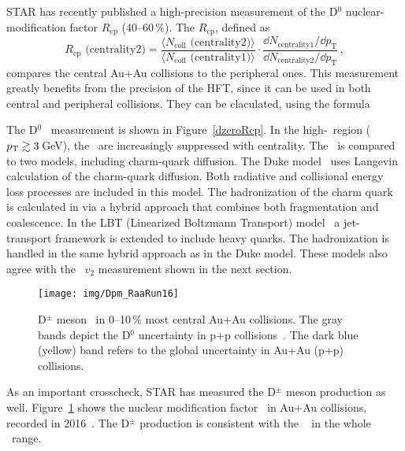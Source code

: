 STAR has recently published a high-precision measurement of the D$^0$  nuclear-modification factor $R_\mathrm{cp}$ (40--60$\,\%$)\@. The $R_\mathrm{cp}$, defined as
\begin{equation}
R_\mathrm{cp}\text{ (centrality2)} = \frac{\langle N_\mathrm{coll}\text{ (centrality2)}\rangle }
{\langle N_\mathrm{coll}\text{ (centrality1)} \rangle}
\cdot
\frac{\dd N_\text{centrality1}/\dd p_\mathrm{T}}
 {\dd N_\text{centrality2}/\dd p_\mathrm{T}}\,,
\end{equation}
compares the central Au+Au collisions to the peripheral ones. This measurement greatly benefits from the precision of the HFT, since it can be used in both central and peripheral collisions. They can be claculated, using the formula





The D$^0$ \Rcp\ measurement is shown in Figure~\ref{dzeroRcp}. In the high-\pt\ region (${}p_{\mathrm{T}}{} \gtrsim 3\,$GeV), the \dzero\ are increasingly suppressed with centrality. The \Rcp\ is compared to two models, including charm-quark diffusion. The Duke model~\cite{Duke, Duke2015} uses Langevin calculation of the charm-quark diffusion. Both radiative and collisional energy loss processes are included in this model. The hadronization of the charm quark is calculated in via a hybrid approach that combines both fragmentation and coalescence. In the LBT (Linearized Boltzmann Transport) model~\cite{LBT, LBTprivate} a jet-transport framework is extended to include heavy quarks. The hadronization is handled in the same hybrid approach as in the Duke model. These models also agree with the \dzero\ $v_2$ measurement shown in the next section.

\begin{figure}[!htb]
\begin{center}
 \texttt{[image: img/Dpm\_RaaRun16]}\\
\end{center}
\caption{\label{dpm} D$^\pm$ meson \Raa\ in 0--10$\,\%$ most central Au+Au collisions. The gray bands depict the D$^0$ uncertainty in p+p collisions~\cite{posterQmVanek,publishedDzero}. The dark blue (yellow) band refers to the global uncertainty in Au+Au (p+p) collisions.}
\end{figure}

As an important crosscheck, STAR has measured the D$^\pm$ meson production as well. Figure~\ref{dpm} shows the nuclear modification factor \Raa\ in Au+Au collisions, recorded in 2016~\cite{posterQmVanek}\@. The D$^\pm$ production is consistent with the \dzero~\cite{publishedDzero} in the whole \pt\ range.

